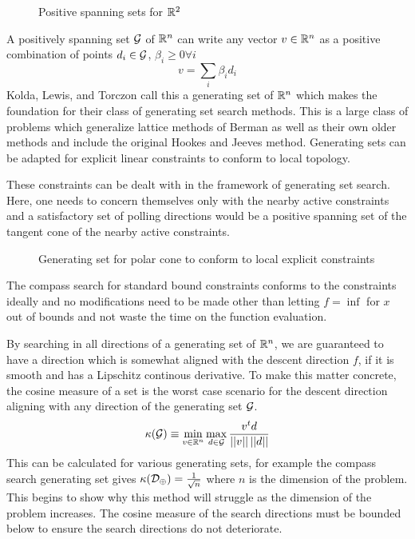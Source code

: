 \begin{figure}
\centering

\caption{Positive spanning sets for $\mathbb{R}^{2}$}
\end{figure}

A positively spanning set $\mathcal{G}$ of $\mathbb{R}^{n}$ can write any vector $v \in \mathbb{R}^{n}$ as a positive combination of points $d_i \in \mathcal{G}$,  $\beta_i \geq 0 \forall i$
\begin{equation}
v = \sum_i \beta_i d_i
\end{equation}
Kolda, Lewis, and Torczon \cite{kolda_2003} call this a generating set of $\mathbb{R}^{n}$ which makes the foundation for their class of generating set search methods.  This is a large class of problems which generalize lattice methods of Berman \cite{berman_1966} \cite{berman_1969} as well as their own older methods \cite{torczon_1997} \cite{lewis_2000} and include the original Hookes and Jeeves method\cite{hooke_1961}.  Generating sets can be adapted for explicit linear constraints to conform to local topology.

These constraints can be dealt with in the framework of generating set search.  Here, one needs to concern themselves only with the nearby active constraints and a satisfactory set of polling directions would be a positive spanning set of the tangent cone of the nearby active constraints. 
\begin{figure}
\centering

\caption{Generating set for polar cone to conform to local explicit constraints}
\end{figure}
The compass search for standard bound constraints conforms to the constraints ideally and no modifications need to be made other than letting $f = \inf $ for $x$ out of bounds and not waste the time on the function evaluation.


By searching in all directions of a generating set of $\mathbb{R}^{n}$, we are guaranteed to have a direction which is somewhat aligned with the descent direction $f$, if it is smooth and has a Lipschitz continous derivative.  To make this matter concrete, the cosine measure of a set is the worst case scenario for the descent direction aligning with any direction of the generating set $\mathcal{G}$.
\begin{equation}\label{kappa}
\kappa ( \mathcal{G}) \equiv \min_{v \in \mathbb{R}^{n}} \max_{d \in \mathcal{G}} \frac{v^t d}{\left| \left| {v} \right| \right| \left| \left| {d} \right| \right|}
\end{equation}
This can be calculated for various generating sets, for example the compass search generating set gives $\kappa(\mathcal{D}_\oplus) = \frac{1}{\sqrt{n}}$ where $n$ is the dimension of the problem.  This begins to show why this method will struggle as the dimension of the problem increases.  The cosine measure of the search directions must be bounded below to ensure the search directions do not deteriorate.

